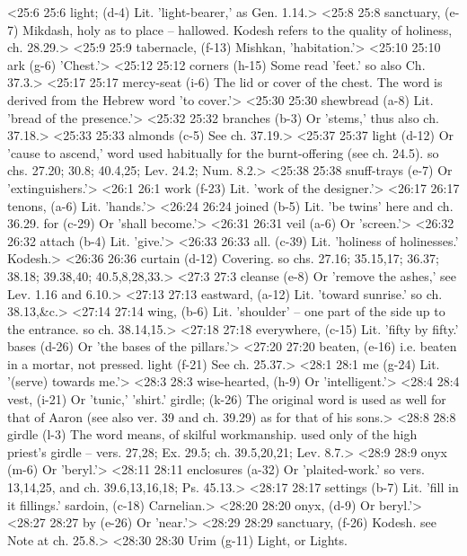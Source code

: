 <25:6 25:6  light; (d-4)  Lit. 'light-bearer,' as Gen. 1.14.>
<25:8 25:8  sanctuary, (e-7)  Mikdash, holy as to place -- hallowed. Kodesh refers to  the quality of holiness, ch. 28.29.>
<25:9 25:9  tabernacle, (f-13)  Mishkan, 'habitation.'>
<25:10 25:10  ark (g-6)  'Chest.'>
<25:12 25:12  corners (h-15)  Some read 'feet.' so also Ch. 37.3.>
<25:17 25:17  mercy-seat (i-6)  The lid or cover of the chest. The word is derived from the  Hebrew word 'to cover.'>
<25:30 25:30  shewbread (a-8)  Lit. 'bread of the presence.'>
<25:32 25:32  branches (b-3)  Or 'stems,' thus also ch. 37.18.>
<25:33 25:33  almonds (c-5)  See ch. 37.19.>
<25:37 25:37  light (d-12)  Or 'cause to ascend,' word used habitually for the  burnt-offering (see ch. 24.5). so chs. 27.20; 30.8; 40.4,25;  Lev. 24.2; Num. 8.2.>
<25:38 25:38  snuff-trays (e-7)  Or 'extinguishers.'>
<26:1 26:1  work (f-23)  Lit. 'work of the designer.'>
<26:17 26:17  tenons, (a-6)  Lit. 'hands.'>
<26:24 26:24  joined (b-5)  Lit. 'be twins' here and ch. 36.29.
  for (c-29)  Or 'shall become.'>
<26:31 26:31  veil (a-6)  Or 'screen.'>
<26:32 26:32  attach (b-4)  Lit. 'give.'>
<26:33 26:33  all. (c-39)  Lit. 'holiness of holinesses.' Kodesh.>
<26:36 26:36  curtain (d-12)  Covering. so chs. 27.16; 35.15,17; 36.37; 38.18; 39.38,40;  40.5,8,28,33.>
<27:3 27:3  cleanse (e-8)  Or 'remove the ashes,' see Lev. 1.16 and 6.10.>
<27:13 27:13  eastward, (a-12)  Lit. 'toward sunrise.' so ch. 38.13,&c.>
<27:14 27:14  wing, (b-6)  Lit. 'shoulder' -- one part of the side up to the entrance.  so ch. 38.14,15.>
<27:18 27:18  everywhere, (c-15)  Lit. 'fifty by fifty.'
  bases (d-26)  Or 'the bases of the pillars.'>
<27:20 27:20  beaten, (e-16)  i.e. beaten in a mortar, not pressed.
  light (f-21)  See ch. 25.37.>
<28:1 28:1  me (g-24)  Lit. '(serve) towards me.'>
<28:3 28:3  wise-hearted, (h-9)  Or 'intelligent.'>
<28:4 28:4  vest, (i-21)  Or 'tunic,' 'shirt.'
  girdle; (k-26)  The original word is used as well for that of Aaron (see also  ver. 39 and ch. 39.29) as for that of his sons.>
<28:8 28:8  girdle (l-3)  The word means, of skilful workmanship. used only of the high  priest's girdle -- vers. 27,28; Ex. 29.5; ch. 39.5,20,21; Lev.  8.7.>
<28:9 28:9  onyx (m-6)  Or 'beryl.'>
<28:11 28:11  enclosures (a-32)  Or 'plaited-work.' so vers. 13,14,25, and ch. 39.6,13,16,18;  Ps. 45.13.>
<28:17 28:17  settings (b-7)  Lit. 'fill in it fillings.'
  sardoin, (c-18)  Carnelian.>
<28:20 28:20  onyx, (d-9)  Or beryl.'>
<28:27 28:27  by (e-26)  Or 'near.'>
<28:29 28:29  sanctuary, (f-26)  Kodesh. see Note at ch. 25.8.>
<28:30 28:30  Urim (g-11)  Light, or Lights.
